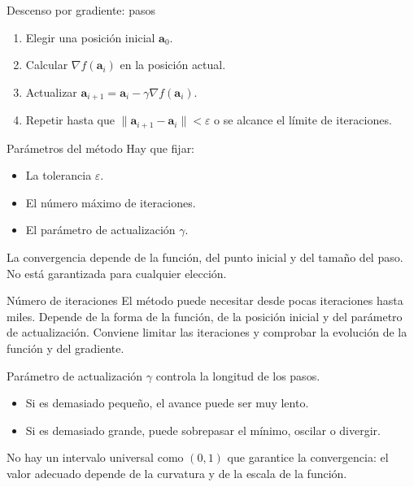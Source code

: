 \documentclass[main.tex]{subfiles}
\begin{document}
\begin{frame}[t]{Descenso por gradiente: pasos}
\begin{enumerate}
\item Elegir una posición inicial $\boldsymbol{a}_0$.
\item Calcular $\nabla f(\boldsymbol{a}_i)$ en la posición actual.
\item Actualizar $\boldsymbol{a}_{i+1}=\boldsymbol{a}_i-\gamma\nabla f(\boldsymbol{a}_i)$.
\item Repetir hasta que $\|\boldsymbol{a}_{i+1}-\boldsymbol{a}_i\|<\varepsilon$ o se alcance el límite de iteraciones.
\end{enumerate}
\end{frame}
\begin{frame}[t]{Parámetros del método}
Hay que fijar:
\begin{itemize}
\item La tolerancia $\varepsilon$.
\item El número máximo de iteraciones.
\item El parámetro de actualización $\gamma$.
\end{itemize}
\bigskip
La convergencia depende de la función, del punto inicial y del tamaño del paso. No está garantizada para cualquier elección.
\end{frame}
\begin{frame}[t]{Número de iteraciones}
El método puede necesitar desde pocas iteraciones hasta miles.
\bigskip
Depende de la forma de la función, de la posición inicial y del parámetro de actualización.
\bigskip
Conviene limitar las iteraciones y comprobar la evolución de la función y del gradiente.
\end{frame}
\begin{frame}[t]{Parámetro de actualización}
$\gamma$ controla la longitud de los pasos.
\begin{itemize}
\item Si es demasiado pequeño, el avance puede ser muy lento.
\item Si es demasiado grande, puede sobrepasar el mínimo, oscilar o divergir.
\end{itemize}
\bigskip
No hay un intervalo universal como $(0,1)$ que garantice la convergencia: el valor adecuado depende de la curvatura y de la escala de la función.
\end{frame}
\end{document}
